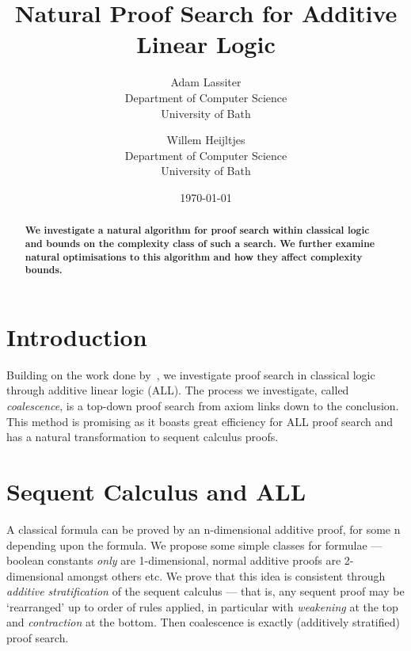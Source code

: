 

\title{Natural Proof Search for Additive Linear Logic}
\author{Adam Lassiter\\Department of Computer Science\\University of Bath \and Willem Heijltjes\\Department of Computer Science\\University of Bath}
\date{\today}



    \maketitle
    \begin{abstract}
        \textbf{
            We investigate a natural algorithm for proof search within classical logic and bounds on the complexity class of such a search.
            We further examine natural optimisations to this algorithm and how they affect complexity bounds.
        }
    \end{abstract}

    \section*{Introduction}
        Building on the work done by~\cite{petri-nets}, we investigate proof search in classical logic through additive linear logic (ALL).
        The process we investigate, called \textit{coalescence}, is a top-down proof search from axiom links down to the conclusion.
        This method is promising as it boasts great efficiency for ALL proof search and has a natural transformation to sequent calculus proofs.

    \section*{Sequent Calculus and ALL}
        A classical formula can be proved by an n-dimensional additive proof, for some n depending upon the formula.
        We propose some simple classes for formulae --- boolean constants \textit{only} are 1-dimensional, normal additive proofs are 2-dimensional amongst others etc.
        We prove that this idea is consistent through \textit{additive stratification} of the sequent calculus --- that is, any sequent proof may be `rearranged' up to order of rules applied, in particular with \textit{weakening} at the top and \textit{contraction} at the bottom.
        Then coalescence is exactly (additively stratified) proof search.


